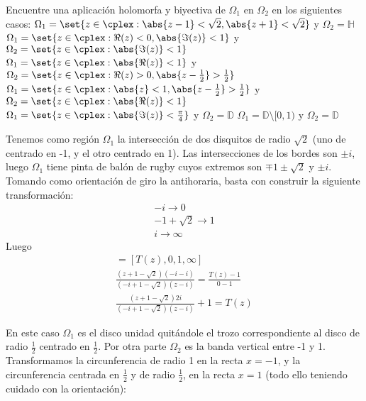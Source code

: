 \begin{problem}[10]
Encuentre una aplicación holomorfa y biyectiva de $\Omega_1$ en $\Omega_2$ en los siguientes casos:
\ppart $\Omega_{1} = \set{z \in \cplex: \abs{z-1} < \sqrt{2}, \abs{z+1} < \sqrt{2}}$ y $\Omega_{2} = \mathbb{H}$
\ppart $\Omega_{1} = \set{z \in \cplex: \Re(z) < 0, \abs{\Im(z)} < 1}$ y $\Omega_{2} = \set{z \in \cplex: \abs{\Im(z)} < 1}$
\ppart $\Omega_{1} = \set{z \in \cplex: \abs{\Re(z)} < 1}$ y $\Omega_{2} = \set{z \in \cplex: \Re(z) > 0, \abs{z - \frac{1}{2}} > \frac{1}{2}}$
\ppart $\Omega_{1} = \set{z \in \cplex: \abs{z} < 1, \abs{z - \frac{1}{2}} > \frac{1}{2}}$ y $\Omega_{2} = \set{z \in \cplex: \abs{\Re(z)} < 1}$
\ppart $\Omega_{1} = \set{z \in \cplex: \abs{\Im(z)} < \frac{\pi}{4}}$ y $\Omega_{2} = \mathbb{D}$
\ppart $\Omega_{1} = \mathbb{D}\setminus[0,1)$ y $\Omega_{2} = \mathbb{D}$
\solution

\spart {}

Tenemos como región $\Omega_1$ la intersección de dos disquitos de radio $\sqrt{2}$ (uno de centrado en -1, y el otro centrado en 1). Las intersecciones de los bordes son $\pm i$, luego $\Omega_1$ tiene pinta de balón de rugby cuyos extremos son $\mp 1 \pm \sqrt{2}$ y $\pm i$. Tomando como orientación de giro la antihoraria, basta con construir la siguiente transformación:
\begin{align*}
	-i \to 0\\
	-1+\sqrt{2} \to 1\\
	i \to \infty
\end{align*}
Luego
\begin{align*}
[z, -i, -1+\sqrt{2}, i] = [T(z), 0, 1, \infty]\\
\frac{(z + 1 - \sqrt{2}) (-i - i)}{(-i + 1 - \sqrt{2}) (z - i)} = \frac{T(z) - 1}{0 - 1}\\
\frac{(z + 1 - \sqrt{2}) 2i}{(-i + 1 - \sqrt{2}) (z - i)} + 1 = T(z)
\end{align*}

\spart

\spart


En este caso $\Omega_1$ es el disco unidad quitándole el trozo correspondiente al disco de radio $\frac{1}{2}$ centrado en $\frac{1}{2}$. Por otra parte $\Omega_2$ es la banda vertical entre -1 y 1. Transformamos la circunferencia de radio 1 en la recta $x=-1$, y la circunferencia centrada en $\frac{1}{2}$ y de radio $\frac{1}{2}$, en la recta $x=1$ (todo ello teniendo cuidado con la orientación):


\end{problem}
